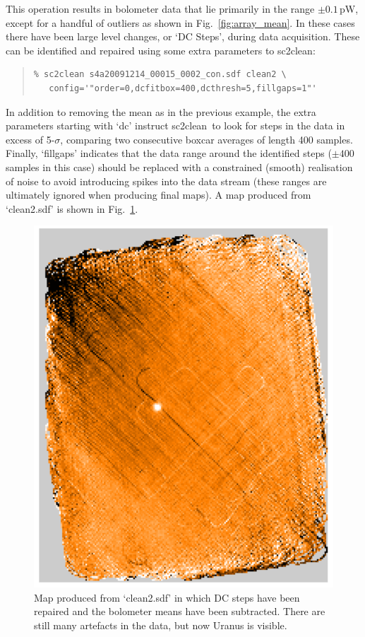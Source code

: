 \documentclass[twoside,11pt]{article}
\newcommand{\xref}[3]{#1}
\renewcommand{\_}{\texttt{\symbol{95}}}
\newenvironment{myquote}{\begin{quote}\begin{small}}{\end{small}\end{quote}}
\newcommand{\task}[1]{\textsf{#1}}
\newcommand{\clean}{\xref{\task{sc2clean}}{sun258}{SC2CLEAN}}
\begin{document}
This operation results in bolometer data that lie primarily in the
range $\pm 0.1$\,pW, except for a handful of outliers as shown in
Fig.~\ref{fig:array_mean}. In these cases there have been large level
changes, or `DC Steps', during data acquisition. These can
be identified and repaired using some extra parameters to \clean:

\begin{myquote}
\begin{verbatim}
% sc2clean s4a20091214_00015_0002_con.sdf clean2 \
   config='"order=0,dcfitbox=400,dcthresh=5,fillgaps=1"'
\end{verbatim}
\end{myquote}

In addition to removing the mean as in the previous example, the extra
parameters starting with `dc' instruct \clean\ to look for steps in
the data in excess of 5-$\sigma$, comparing two consecutive boxcar
averages of length 400 samples.  Finally, `fillgaps' indicates that
the data range around the identified steps ($\pm 400$ samples in this
case) should be replaced with a constrained (smooth) realisation of
noise to avoid introducing spikes into the data stream (these ranges
are ultimately ignored when producing final maps). A map produced from
`clean2.sdf' is shown in Fig.~\ref{fig:map_dc_mean}.

\begin{figure}
\begin{center}
\includegraphics[width=0.5\linewidth]{sc19_map_mean_dc}
\caption{Map produced from `clean2.sdf' in which DC steps have been
  repaired and the bolometer means have been subtracted. There are
  still many artefacts in the data, but now Uranus is visible.}
\label{fig:map_dc_mean}
\end{center}
\end{figure}
\end{document}
